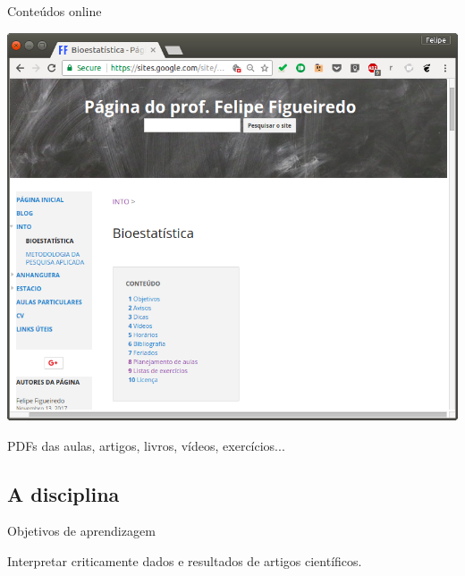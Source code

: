 \documentclass{beamer}
\begin{document}
\begin{frame}{Conteúdos online}
  \begin{center}
    \includegraphics[height=.7\textheight]{Intro/pg-disciplina}
    \begin{exampleblock}{}
      \begin{center}
        PDFs das aulas, artigos, livros, vídeos, exercícios...
      \end{center}
    \end{exampleblock}
  \end{center}
\end{frame}

\subsection{A disciplina}

\begin{frame}{Objetivos de aprendizagem}
  \begin{block}{}
    Interpretar criticamente dados e resultados de artigos científicos.
  \end{block}
\end{frame}
\end{document}
